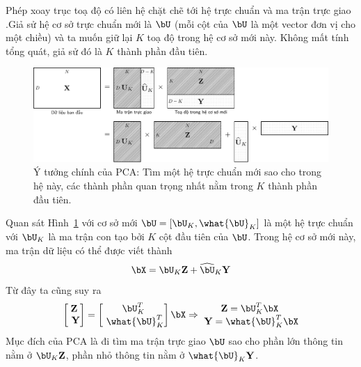 Phép xoay trục toạ độ có liên hệ chặt chẽ tới hệ trực chuẩn và ma trận trực giao
.Giả sử hệ cơ sở trực chuẩn mới là $\bU$ (mỗi cột của $\bU$ là một vector đơn vị cho
một chiều) và ta muốn giữ lại $K$ toạ độ trong hệ
cơ sở mới này. Không mất tính tổng quát, giả sử đó là $K$ thành phần đầu tiên.
\begin{figure}[t]
    \centering
    \includegraphics[width = \textwidth]{Chapters/content/27_pca/latex/pca_idea.pdf}
    \caption[]{Ý tưởng chính của PCA: Tìm một hệ trực chuẩn mới sao cho trong hệ này, các thành phần quan trọng nhất nằm trong $K$ thành phần đầu tiên.}
    \label{fig:27_3}
\end{figure}
Quan sát Hình~\ref{fig:27_3} với cơ sở mới $\bU =
    [\bU_K, \what{\bU}_K]$ là một hệ trực chuẩn với $\bU_K$ là ma trận con tạo bởi $K$ cột đầu tiên của $\bU$. Trong hệ cơ sở mới này, ma trận dữ liệu có thể được viết thành
\begin{equation}
    \label{eqn:27_8}
    \bX = \bU_K \mathbf{Z} + \widehat{\bU}_K \mathbf{Y}
\end{equation}
Từ đây ta cũng suy ra
\begin{eqnarray}
    \label{eqn:27_9}
    \left[\begin{matrix} \mathbf{Z} \\\ \mathbf{Y} \end{matrix} \right] =
    \left[\begin{matrix} \bU_K^T \\\ \what{\bU}_K^T \end{matrix} \right]\bX \Rightarrow
    \begin{matrix}
        \mathbf{Z} = \bU_K^T \bX \\\
        \mathbf{Y} = \what{\bU}_K^T\bX
    \end{matrix}
\end{eqnarray}
Mục đích của PCA là đi tìm ma trận trực giao $\bU$ sao cho phần lớn thông tin
nằm ở $\bU_K \mathbf{Z}$, phần nhỏ thông tin nằm ở $\what{\bU}_K\mathbf{Y}$.
